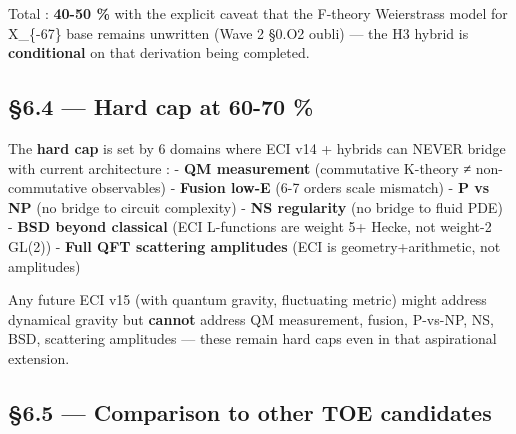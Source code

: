 \documentclass[
  11pt,
  a4paper,
]{article}
\begin{document}
Total : \textbf{40-50 \%} with the explicit caveat that the F-theory Weierstrass model for X\_\{-67\} base remains unwritten (Wave 2 §0.O2 oubli) --- the H3 hybrid is \textbf{conditional} on that derivation being completed.

\hypertarget{hard-cap-at-60-70}{%
\subsection{§6.4 --- Hard cap at 60-70 \%}\label{hard-cap-at-60-70}}

The \textbf{hard cap} is set by 6 domains where ECI v14 + hybrids can NEVER bridge with current architecture :
- \textbf{QM measurement} (commutative K-theory ≠ non-commutative observables)
- \textbf{Fusion low-E} (6-7 orders scale mismatch)
- \textbf{P vs NP} (no bridge to circuit complexity)
- \textbf{NS regularity} (no bridge to fluid PDE)
- \textbf{BSD beyond classical} (ECI L-functions are weight 5+ Hecke, not weight-2 GL(2))
- \textbf{Full QFT scattering amplitudes} (ECI is geometry+arithmetic, not amplitudes)

Any future ECI v15 (with quantum gravity, fluctuating metric) might address dynamical gravity but \textbf{cannot} address QM measurement, fusion, P-vs-NP, NS, BSD, scattering amplitudes --- these remain hard caps even in that aspirational extension.

\hypertarget{comparison-to-other-toe-candidates}{%
\subsection{§6.5 --- Comparison to other TOE candidates}\label{comparison-to-other-toe-candidates}}
\end{document}
